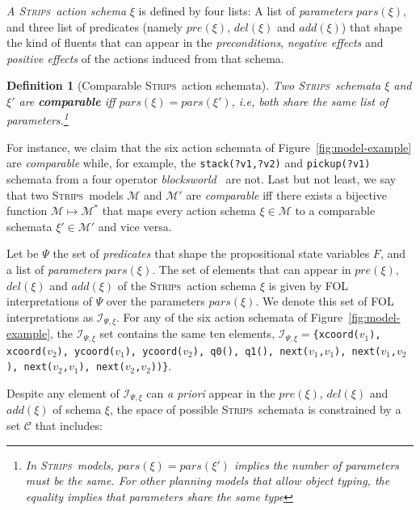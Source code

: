 \documentclass[letterpaper]{article} %
\newcommand{\strips}{\textsc{Strips}}     %
\newtheorem{definition}[theorem]{Definition}
\begin{document}
{\em A \strips\ action schema} $\xi$ is defined by four lists: A list of {\em parameters} $pars(\xi)$, and three list of predicates (namely $pre(\xi)$, $del(\xi)$ and $add(\xi)$) that shape the kind of fluents that can appear in the {\em preconditions}, {\em negative effects} and {\em positive effects} of the actions induced from that schema.

\begin{definition}[Comparable \strips\ action schemata]
Two \strips\ schemata $\xi$ and $\xi'$ are {\bf comparable} iff $pars(\xi)=pars(\xi')$, i.e, both share the same list of parameters.\footnote{In \strips\ models, $pars(\xi)=pars(\xi')$ implies the number of parameters must be the same. For other planning models that allow object typing, the equality implies that parameters share the same type}
\end{definition}

For instance, we claim that the six action schemata of Figure~\ref{fig:model-example} are {\em comparable} while, for example, the {\small\tt stack(?v1,?v2)} and {\small\tt pickup(?v1)} schemata from a four operator {\em blocksworld}~\cite{slaney2001blocks} are not. Last but not least, we say that two \strips\ models $\mathcal{M}$ and $\mathcal{M}'$ are {\em comparable} iff there exists a bijective function $\mathcal{M} \mapsto \mathcal{M}^*$ that maps every action schema $\xi\in\mathcal{M}$ to a comparable schemata $\xi'\in\mathcal{M'}$ and vice versa.

Let be $\Psi$ the set of {\em predicates} that shape the propositional state variables $F$, and a list of {\em parameters} $pars(\xi)$. The set of elements that can appear in $pre(\xi)$, $del(\xi)$ and $add(\xi)$ of the \strips\ action schema $\xi$ is given by FOL interpretations of $\Psi$ over the parameters $pars(\xi)$. We denote this set of FOL interpretations as ${\mathcal I}_{\Psi,\xi}$. For any of the six action schemata of Figure~\ref{fig:model-example}, the ${\mathcal I}_{\Psi,\xi}$ set contains the same ten elements, ${\mathcal I}_{\Psi,\xi}=${\small\tt\{xcoord($v_1$), xcoord($v_2$), ycoord($v_1$), ycoord($v_2$), q0(), q1(), next($v_1$,$v_1$), next($v_1$,$v_2$), next($v_2$,$v_1$), next($v_2$,$v_2$))\}}.

Despite any element of ${\mathcal I}_{\Psi,\xi}$ can {\em a priori} appear in the $pre(\xi)$, $del(\xi)$ and $add(\xi)$ of schema $\xi$, the space of possible \strips\ schemata is constrained by a set ${\mathcal C}$ that includes:
\end{document}
